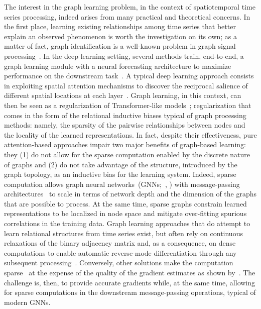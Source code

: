 The interest in the graph learning problem, in the context of spatiotemporal time series processing, indeed arises from many practical and theoretical concerns. In the first place, learning existing relationships among time series that better explain an observed phenomenon is worth the investigation on its own; as a matter of fact, graph identification is a well-known problem in graph signal processing~\citep{mei2016signal, variddhisai2020methods}. In the deep learning setting, several methods train, end-to-end, a graph learning module with a neural forecasting architecture to maximize performance on the downstream task~\citep{shang2021discrete, wu2020connecting}. A typical deep learning approach consists in exploiting spatial attention mechanisms to discover the reciprocal salience of different spatial locations at each layer~\citep{satorras2022multivariate, rampavsek2022recipe}. Graph learning, in this context, can then be seen as a regularization of Transformer-like models~\citep{vaswani2017attention}; regularization that comes in the form of the relational inductive biases typical of graph processing methods: namely, the sparsity of the pairwise relationships between nodes and the locality of the learned representations. In fact, despite their effectiveness, pure attention-based approaches impair two major benefits of graph-based learning: they (1) do not allow for the sparse computation enabled by the discrete nature of graphs and (2) do not take advantage of the structure, introduced by the graph topology, as an inductive bias for the learning system. Indeed, sparse computation allows graph neural networks~(GNNs;~\citealt{scarselli2008graph}, \citealt{bacciu2020gentle}) with message-passing architectures~\citep{gilmer2017neural} to scale in terms of network depth and the dimension of the graphs that are possible to process. At the same time, sparse graphs constrain learned representations to be localized in node space and mitigate over-fitting spurious correlations in the training data. Graph learning approaches that do attempt to learn relational structures from time series exist, but often rely on continuous relaxations of the binary adjacency matrix and, as a consequence, on dense computations to enable automatic reverse-mode differentiation through any subsequent processing~\citep{shang2021discrete, kipf2018neural}. Conversely, other solutions make the computation sparse~\citep{wu2020connecting, deng2021graph} at the expense of the quality of the gradient estimates as shown by~\citet{zugner2021study}. The challenge is, then, to provide accurate gradients while, at the same time, allowing for sparse computations in the downstream message-passing operations, typical of modern GNNs.

